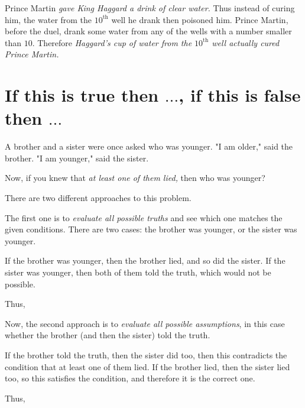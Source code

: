 \documentclass{article}
\begin{document}
\begin{soln} 
    Prince Martin \textit{gave King Haggard a drink of clear water.}
    Thus instead of curing him, the water from the $10^{\text{th}}$ well he drank then poisoned him.
    Prince Martin, before the duel, drank some water from any of the wells with a number smaller than $10.$
    Therefore \textit{Haggard's cup of water from the $10^{\text{th}}$ well actually cured Prince Martin.}
\end{soln}

\section*{If this is true then $\ldots$, if this is false then $\ldots$}

\begin{example*}
    \label{example:pi-2022-4-p7}
    A brother and a sister were once asked who was younger. "I am older," said the brother.
    "I am younger," said the sister.

    Now, if you knew that \textit{at least one of them lied,}
    then who was younger?
\end{example*}

There are two different approaches to this problem.

\begin{soln}
    The first one is to \textit{evaluate all possible truths} and see which one matches the given conditions.
    There are two cases: the brother was younger, or the sister was younger.  
    
    If the brother was younger, then the brother lied, and so did the sister.
    If the sister was younger, then both of them told the truth, which would not be possible.

    Thus, 
\end{soln}

\begin{soln}
    Now, the second approach is to \textit{evaluate all possible assumptions},
    in this case whether the brother (and then the sister) told the truth.
    
    If the brother told the truth, then the sister did too, then
    this contradicts the condition that at least one of them lied.
    If the brother lied, then the sister lied too, so
    this satisfies the condition, and therefore it is the correct one.

    Thus, 
\end{soln}
\end{document}
